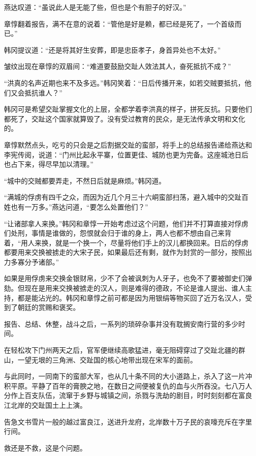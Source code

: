 燕达叹道：“虽说此人是无能了些，但也是个有胆子的好汉。”

章惇翻着报告，满不在意的说着：“管他是好是赖，都已经是死了，一个首级而已。”

韩冈提议道：“还是将其好生安葬，即是忠臣孝子，身首异处也不太好。”

皱纹出现在章惇的双眉间：“难道要鼓励交趾人效法其人，奋死抵抗不成？”

“洪真的名声近期也来不及多远。”韩冈笑着：“日后传播开来，如若交贼要抵抗，他们又会抵抗谁人？”

韩冈可是希望交趾掌握文化的上层，全都学着李洪真的样子，拼死反抗。只要他们都死了，交趾这个国家就算毁了。没有受过教育的民众，是无法传承文明和文化的。

章惇默然点头，吃亏的只会是之后割据交趾的蛮部，将手上的总结报告递给燕达和李宪传阅，说道：“门州比起永平寨，位置更佳、城防也更为完备。这座城池日后也占下来，得尽早加以清理。”

“城中的交贼都要弄走，不然日后就是麻烦。”韩冈道。

“满城的俘虏有四千之众，而因为近几个月三十六峒蛮部扫荡，避入城中的交趾百姓也有一万多。”燕达问道，“要怎么处置他们？”

“让诸部拿人来换。”韩冈和章惇一开始考虑过这个问题，他们并不打算直接对俘虏们处刑，事情是谁做的，怨恨就会归于谁的身上，两人也都不想由自己来背着，“用人来换，就是一个换一个，尽量将他们手上的汉儿都换回来。日后的俘虏都要用来交换被掳走的大宋子民，如果最后还有剩，就作为封赏的一部分，按照出力多寡分予诸部。”

如果是用俘虏来交换金银财帛，少不了会被讽刺为人牙子，也免不了要被御史们弹劾。但现在是用来交换被掳走的汉人，则是难得的德政，不论是谁人提出、谁人主持，都是能沾光的。韩冈和章惇之前可都是因为用银绢等物买回了近万名汉人，受到了朝廷的赏赐和褒奖。

报告、总结、休整，战斗之后，一系列的琐碎杂事并没有耽搁安南行营的多少时间。

在轻松攻下门州两天之后，官军便继续高歌猛进，毫无阻碍穿过了交趾北疆的群山，一望无垠的三角洲、交趾国的核心地带出现在宋军的面前。

与此同时，一同南下的蛮部大军，也从几十条不同的大小道路上，杀入了这一片冲积平原。平静了百年的膏腴之地，在数日之间便被复仇的血与火所吞没。七八万人分作上百支队伍，流窜于乡野与城镇之间，杀戮与洗劫的剧目，时时刻刻都在富良江北岸的交趾国土上上演。

告急文书雪片一般的越过富良江，送进升龙府，北岸数十万子民的哀嚎充斥在字里行间。

救还是不救，这是个问题。

